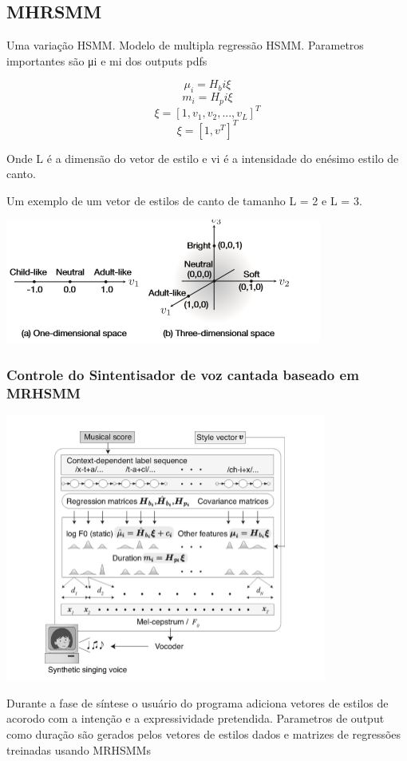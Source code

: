 		\subsection{MHRSMM}
		Uma variação HSMM. Modelo de multipla regressão HSMM.
		Parametros importantes são μi e mi dos outputs pdfs
		
		\[ \mu_i = H_bi \xi \] 
		\[	m_i   = H_pi \xi  \]
		\[ \xi   = [1,v_1,v_2,...,v_L]^T \]	
		\[ \xi   = [1,v^T]^T	\]	
		
		Onde L é a dimensão do vetor de estilo e vi  é  a intensidade do  enésimo estilo de canto.
		
		Um exemplo de um vetor de estilos de canto de tamanho L =  2 e L = 3.
		
		\includegraphics{exemploHMM.png}
		
		\subsubsection{Controle do Sintentisador de voz cantada baseado em MRHSMM}
		
		\includegraphics{esquemaHMM.png}
		
		Durante a fase de síntese o usuário do programa adiciona vetores de estilos de acorodo com a intenção e a expressividade pretendida.
		Parametros de output como duração são gerados pelos vetores de estilos dados e matrizes de regressões treinadas usando MRHSMMs
		
